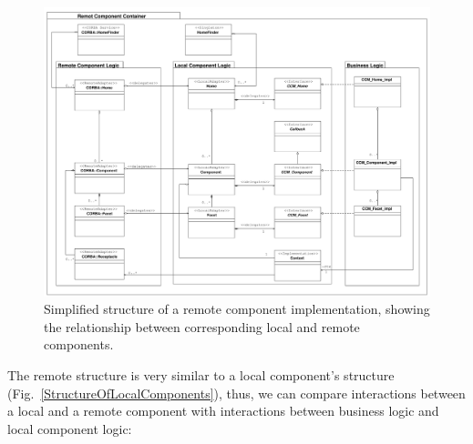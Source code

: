 \begin{figure}[htbp]
    \begin{center}
    \includegraphics [width=15cm,angle=0] 
		     {ComponentModel/uml/StructureOfRemoteComponents}
    \caption{Simplified structure of a remote component implementation,
    showing the relationship between corresponding local and remote components.}
    \label{StructureOfRemoteComponents}            
    \end{center}
\end{figure}

\noindent
The remote structure is very similar to a local component's structure 
(Fig.~\ref{StructureOfLocalComponents}), thus, we can compare interactions
between a local and a remote component with interactions between business logic
and local component logic:

